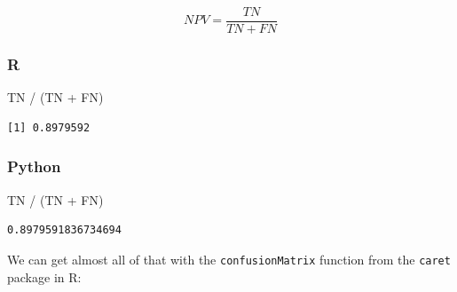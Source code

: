 \documentclass[
  letterpaper,
]{krantz}
\newenvironment{Shaded}{}{}
\newcommand{\AttributeTok}[1]{\textcolor[rgb]{0.49,0.56,0.16}{#1}}
\newcommand{\FunctionTok}[1]{\textcolor[rgb]{0.02,0.16,0.49}{#1}}
\newcommand{\NormalTok}[1]{#1}
\newcommand{\OperatorTok}[1]{\textcolor[rgb]{0.40,0.40,0.40}{#1}}
\newcommand{\SpecialCharTok}[1]{\textcolor[rgb]{0.25,0.44,0.63}{#1}}
\newcommand{\StringTok}[1]{\textcolor[rgb]{0.25,0.44,0.63}{#1}}
\begin{document}
\[NPV = \frac{TN}{TN + FN}\]

\subsubsection{R}

\begin{Shaded}
\begin{Highlighting}[]
\NormalTok{TN }\SpecialCharTok{/}\NormalTok{ (TN }\SpecialCharTok{+}\NormalTok{ FN)}
\end{Highlighting}
\end{Shaded}

\begin{verbatim}
[1] 0.8979592
\end{verbatim}

\subsubsection{Python}

\begin{Shaded}
\begin{Highlighting}[]
\NormalTok{TN }\OperatorTok{/}\NormalTok{ (TN }\OperatorTok{+}\NormalTok{ FN)}
\end{Highlighting}
\end{Shaded}

\begin{verbatim}
0.8979591836734694
\end{verbatim}

We can get almost all of that with the \texttt{confusionMatrix} function
from the \texttt{caret} package in R:

\begin{Shaded}
\end{Shaded}
\end{document}
